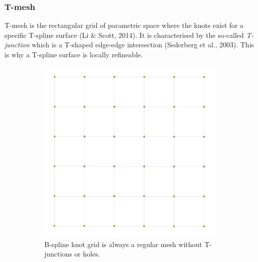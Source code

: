 \documentclass{article}
\begin{document}
\subsubsection{T-mesh}

\vspace{6pt}

T-mesh is the rectangular grid of parametric space where the knots exist for a specific T-spline surface (Li $\&$ Scott, 2014). It is characterised by the so-called \emph{T-junction} which is a T-shaped edge-edge intersection (Sederberg et al., 2003). This is why a T-spline surface is locally refineable.

\begin{figure}[H]
\centering
\begin{subfigure}[b]{0.48\textwidth}
\includegraphics[width=\textwidth]{bsplinegrid}
\caption{B-spline knot grid is always a regular mesh without T-junctions or holes.}
\label{bsplinegrid}
\end{subfigure}
\begin{subfigure}[b]{0.48\textwidth}

\end{subfigure}
\end{figure}
\end{document}
